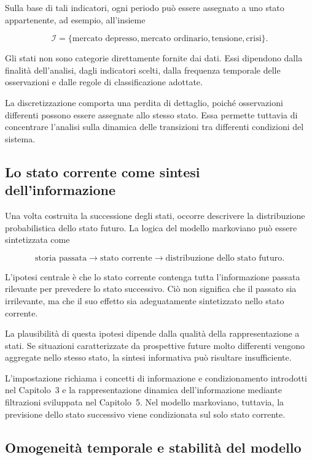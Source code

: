 Sulla base di tali indicatori, ogni periodo pu\`{o} essere assegnato a
uno stato appartenente, ad esempio, all'insieme

\[
\mathcal{I}
=
\{
\text{mercato depresso},
\text{mercato ordinario},
\text{tensione},
\text{crisi}
\}.
\]

Gli stati non sono categorie direttamente fornite dai dati. Essi
dipendono dalla finalit\`{a} dell'analisi, dagli indicatori scelti,
dalla frequenza temporale delle osservazioni e dalle regole di
classificazione adottate.

La discretizzazione comporta una perdita di dettaglio, poich\'{e}
osservazioni differenti possono essere assegnate allo stesso stato.
Essa permette tuttavia di concentrare l'analisi sulla dinamica delle
transizioni tra differenti condizioni del sistema.

\subsection{Lo stato corrente come sintesi dell'informazione}

Una volta costruita la successione degli stati, occorre descrivere la
distribuzione probabilistica dello stato futuro. La logica del modello
markoviano pu\`{o} essere sintetizzata come

\[
\text{storia passata}
\longrightarrow
\text{stato corrente}
\longrightarrow
\text{distribuzione dello stato futuro}.
\]

L'ipotesi centrale \`{e} che lo stato corrente contenga tutta
l'informazione passata rilevante per prevedere lo stato successivo.
Ci\`{o} non significa che il passato sia irrilevante, ma che il suo
effetto sia adeguatamente sintetizzato nello stato corrente.

La plausibilit\`{a} di questa ipotesi dipende dalla qualit\`{a} della
rappresentazione a stati. Se situazioni caratterizzate da prospettive
future molto differenti vengono aggregate nello stesso stato, la
sintesi informativa pu\`{o} risultare insufficiente.

L'impostazione richiama i concetti di informazione e condizionamento
introdotti nel Capitolo~3 e la rappresentazione dinamica
dell'informazione mediante filtrazioni sviluppata nel Capitolo~5. Nel
modello markoviano, tuttavia, la previsione dello stato successivo viene
condizionata sul solo stato corrente.

\subsection{Omogeneit\`{a} temporale e stabilit\`{a} del modello}

